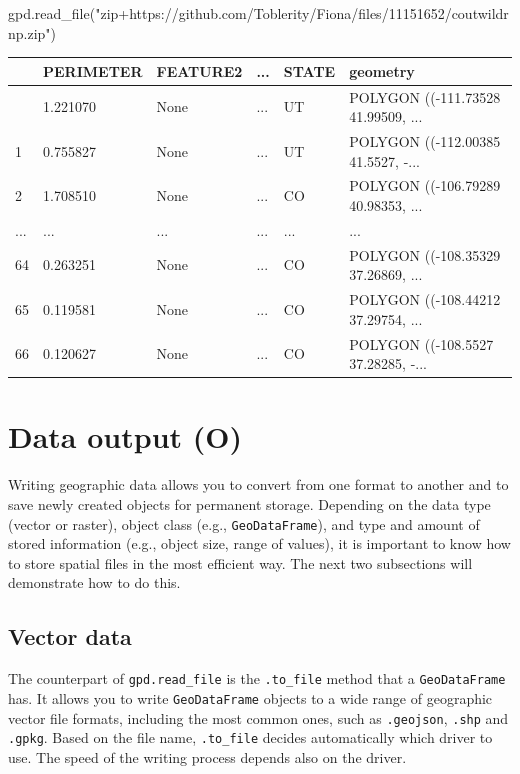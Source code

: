 \documentclass[
  letterpaper,
]{krantz}
\newenvironment{Shaded}{\begin{snugshade}}{\end{snugshade}}
\newcommand{\NormalTok}[1]{\textcolor[rgb]{0.00,0.23,0.31}{#1}}
\newcommand{\StringTok}[1]{\textcolor[rgb]{0.13,0.47,0.30}{#1}}
\begin{document}
\begin{Shaded}
\begin{Highlighting}[]
\NormalTok{gpd.read\_file(}\StringTok{"zip+https://github.com/Toblerity/Fiona/files/11151652/coutwildrnp.zip"}\NormalTok{)}
\end{Highlighting}
\end{Shaded}

\begin{longtable}[]{@{}llllll@{}}
\toprule\noalign{}
& PERIMETER & FEATURE2 & ... & STATE & geometry \\
\midrule\noalign{}
\endhead
\bottomrule\noalign{}
\endlastfoot
0 & 1.221070 & None & ... & UT & POLYGON ((-111.73528 41.99509, ... \\
1 & 0.755827 & None & ... & UT & POLYGON ((-112.00385 41.5527, -... \\
2 & 1.708510 & None & ... & CO & POLYGON ((-106.79289 40.98353, ... \\
... & ... & ... & ... & ... & ... \\
64 & 0.263251 & None & ... & CO & POLYGON ((-108.35329 37.26869, ... \\
65 & 0.119581 & None & ... & CO & POLYGON ((-108.44212 37.29754, ... \\
66 & 0.120627 & None & ... & CO & POLYGON ((-108.5527 37.28285, -... \\
\end{longtable}

\section{Data output (O)}\label{sec-data-output}

Writing geographic data allows you to convert from one format to another
and to save newly created objects for permanent storage. Depending on
the data type (vector or raster), object class (e.g.,
\texttt{GeoDataFrame}), and type and amount of stored information (e.g.,
object size, range of values), it is important to know how to store
spatial files in the most efficient way. The next two subsections will
demonstrate how to do this.

\subsection{Vector data}\label{vector-data}

The counterpart of \texttt{gpd.read\_file} is the \texttt{.to\_file}
method that a \texttt{GeoDataFrame} has. It allows you to write
\texttt{GeoDataFrame} objects to a wide range of geographic vector file
formats, including the most common ones, such as \texttt{.geojson},
\texttt{.shp} and \texttt{.gpkg}. Based on the file name,
\texttt{.to\_file} decides automatically which driver to use. The speed
of the writing process depends also on the driver.
\end{document}
